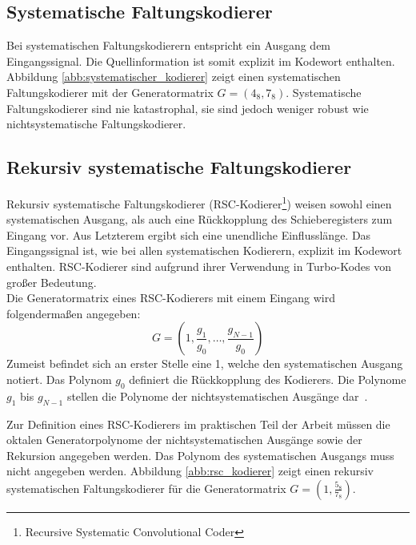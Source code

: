 \subsection{Systematische Faltungskodierer}
\label{kapitel:grundlagen_systematische_kodierer}
Bei systematischen Faltungskodierern entspricht ein Ausgang dem Eingangssignal. Die Quellinformation ist somit explizit im Kodewort enthalten. Abbildung \ref{abb:systematischer_kodierer} zeigt einen systematischen Faltungskodierer mit der Generatormatrix $G=\left( 4_{8},7_{8}\right)$. Systematische Faltungskodierer sind nie katastrophal, sie sind jedoch weniger robust wie nichtsystematische Faltungskodierer.~\cite[S.~217]{schonfeld2012informations}

\subsection{Rekursiv systematische Faltungskodierer}
\label{kapitel:grundlagen_rsc}
Rekursiv systematische Faltungskodierer (RSC-Kodierer\footnote{Recursive Systematic Convolutional Coder}) weisen sowohl einen systematischen Ausgang, als auch eine Rückkopplung des Schieberegisters zum Eingang vor. Aus Letzterem ergibt sich eine unendliche Einflusslänge. Das Eingangssignal ist, wie bei allen systematischen Kodierern, explizit im Kodewort enthalten. RSC-Kodierer sind aufgrund ihrer Verwendung in Turbo-Kodes von großer Bedeutung.
\\
Die Generatormatrix eines RSC-Kodierers mit einem Eingang wird folgendermaßen angegeben:
\begin{equation}
G=\left( 1, \frac{g_{1}}{g_{0}},\dots , \frac{g_{N-1}}{g_{0}} \right)
\end{equation}
Zumeist befindet sich an erster Stelle eine 1, welche den systematischen Ausgang notiert. Das Polynom $g_{0}$ definiert die Rückkopplung des Kodierers. Die Polynome $g_{1}$ bis $g_{N-1}$ stellen die Polynome der nichtsystematischen Ausgänge dar~\cite[S.~92~f.]{morelos2006art}.

Zur Definition eines RSC-Kodierers im praktischen Teil der Arbeit müssen die oktalen Generatorpolynome der nichtsystematischen Ausgänge sowie der Rekursion angegeben werden. Das Polynom des systematischen Ausgangs muss nicht angegeben werden. Abbildung \ref{abb:rsc_kodierer} zeigt einen rekursiv systematischen Faltungskodierer für die Generatormatrix $G=\left( 1,\frac{5_{8}}{7_{8}}\right)$.

